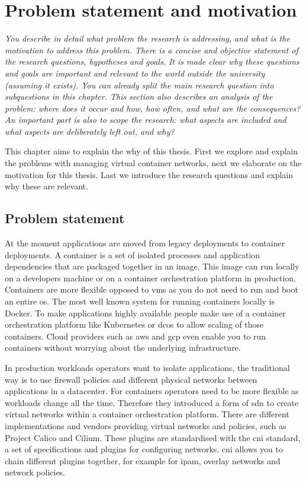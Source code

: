 \chapter{Problem statement and motivation}
\emph{You describe in detail what problem the research is addressing,
and what is the motivation to address this problem. There is a concise and objective
statement of the research questions, hypotheses and goals. It is made clear why these questions
and goals are important and relevant to the world outside the university (assuming it exists).
You can already split the main research question into subquestions in this chapter. This section
also describes an analysis of the problem: where does it occur and how, how often, and what are
the consequences? An important part is also to scope the research: what aspects are included
and what aspects are deliberately left out, and why?}

This chapter aims to explain the why of this thesis. First we explore and explain the problems with managing virtual container networks, next we elaborate on the motivation for this thesis. Last we introduce the research questions and explain why these are relevant.

\section{Problem statement}
At the moment applications are moved from legacy deployments to container deployments. A container is a set of isolated processes and application dependencies that are packaged together in an image. This image can run locally on a developers machine or on a container orchestration platform in production. Containers are more flexible opposed to \glspl{vm} as you do not need to run and boot an entire \gls{os}. The most well known system for running containers locally is Docker\cite{docker}. To make applications highly available people make use of a container orchestration platform like Kubernetes\cite{kubernetes} or \gls{dcos}\cite{dcos} to allow scaling of those containers. Cloud providers such as \gls{aws}\cite{aws} and \gls{gcp}\cite{gcp} even enable you to run containers without worrying about the underlying infrastructure.

In production workloads operators want to isolate applications, the traditional way is to use firewall policies and different physical networks between applications in a datacenter. For containers operators need to be more flexible as workloads change all the time. Therefore they introduced a form of \gls{sdn} to create virtual networks within a container orchestration platform.  There are different implementations and vendors providing virtual networks and policies, such as Project Calico\cite{calico} and Cilium\cite{cilium}. These plugins are standardised with the \gls{cni}\cite{cni} standard, a set of specifications and plugins for configuring networks. \Gls{cni} allows you to chain different plugins together, for example for \gls{ipam}, overlay networks and network policies.

